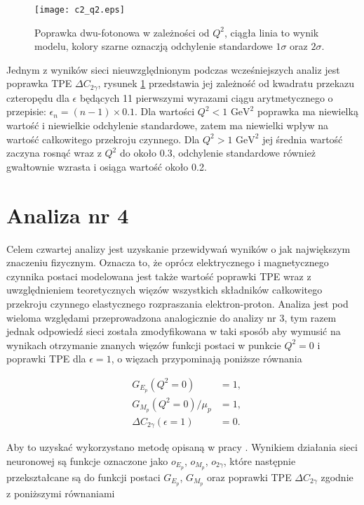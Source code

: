 \documentclass[11pt]{book}
\theoremstyle{definition}
\begin{document}
\begin{figure}[h!]
	\centering
	\texttt{[image: c2\_q2.eps]}
	\caption{Poprawka dwu-fotonowa w zależności od $Q^2$, ciągła linia to wynik modelu, kolory szarne oznaczją odchylenie standardowe $1\sigma$ oraz $2\sigma$.} 
	\label{fig:c2}
\end{figure}

Jednym z wyników sieci nieuwzględnionym podczas wcześniejszych analiz jest poprawka TPE $\Delta C_{2\gamma}$, rysunek \ref{fig:c2} przedstawia jej zależność od kwadratu przekazu czteropędu dla $\epsilon$ będących 11 pierwszymi wyrazami ciągu arytmetycznego o przepisie: $\epsilon_n = (n-1) \times 0.1$. Dla wartości $Q^2 < 1 \text{ GeV}^2$ poprawka ma niewielką wartość i niewielkie odchylenie standardowe, zatem ma niewielki wpływ na wartość całkowitego przekroju czynnego.  Dla $Q^2 > 1 \text{ GeV}^2$ jej średnia wartość zaczyna rosnąć wraz z $Q^2$ do około 0.3, odchylenie standardowe również gwałtownie wzrasta i osiąga wartość około 0.2.


\newpage

\section{Analiza nr 4}

Celem czwartej analizy jest uzyskanie przewidywań wyników o jak największym znaczeniu fizycznym. Oznacza to, że oprócz elektrycznego i magnetycznego czynnika postaci modelowana jest także wartość poprawki TPE wraz z uwzględnieniem teoretycznych więzów wszystkich składników całkowitego przekroju czynnego elastycznego rozpraszania elektron-proton. Analiza jest pod wieloma względami przeprowadzona analogicznie do analizy nr 3, tym razem jednak odpowiedź sieci została zmodyfikowana w taki sposób aby wymusić na wynikach otrzymanie znanych więzów funkcji postaci w punkcie $Q^2 = 0$  i poprawki TPE dla $\epsilon=1$, o więzach przypominają poniższe równania

\begin{eqnarray}
&G_{E_p}(Q^2 = 0) &= 1, \\
&G_{M_p}(Q^2 = 0)/ \mu_p &= 1, \\
&\Delta C_{2 \gamma}(\epsilon=1) &= 0. 
\end{eqnarray}

Aby to uzyskać wykorzystano metodę opisaną w pracy \cite{2014PhRvC..90e4334G}. Wynikiem działania sieci neuronowej są funkcje oznaczone jako $o_{E_p}$, $o_{M_p}$, $ o_{2 \gamma}$, które następnie przekształcane są do funkcji postaci $G_{E_p}$, $G_{M_p}$ oraz poprawki TPE $\Delta C_{2 \gamma}$ zgodnie z poniższymi równaniami
\end{document}
